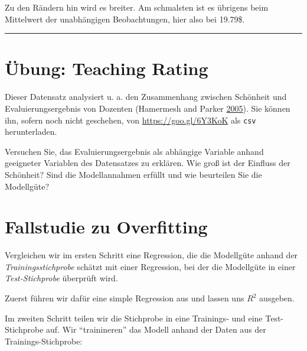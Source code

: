 \documentclass[12pt,]{book}
\newenvironment{Shaded}{\begin{snugshade}}{\end{snugshade}}
\newcommand{\KeywordTok}[1]{\textcolor[rgb]{0.13,0.29,0.53}{\textbf{{#1}}}}
\newcommand{\DataTypeTok}[1]{\textcolor[rgb]{0.13,0.29,0.53}{{#1}}}
\newcommand{\StringTok}[1]{\textcolor[rgb]{0.31,0.60,0.02}{{#1}}}
\newcommand{\CommentTok}[1]{\textcolor[rgb]{0.56,0.35,0.01}{\textit{{#1}}}}
\newcommand{\NormalTok}[1]{{#1}}
\begin{document}
Zu den Rändern hin wird es breiter. Am schmalsten ist es übrigens beim
Mittelwert der unabhängigen Beobachtungen, hier also bei 19.79\$.

\begin{center}\rule{0.5\linewidth}{\linethickness}\end{center}

\section{Übung: Teaching Rating}\label{ubung-teaching-rating}

Dieser Datensatz analysiert u. a. den Zusammenhang zwischen Schönheit
und Evaluierungsergebnis von Dozenten (Hamermesh and Parker
\protect\hyperlink{ref-hamermesh2005beauty}{2005}). Sie können ihn,
sofern noch nicht geschehen, von \url{https://goo.gl/6Y3KoK} als
\texttt{csv} herunterladen.

Versuchen Sie, das Evaluierungsergebnis als abhängige Variable anhand
geeigneter Variablen des Datensatzes zu erklären. Wie groß ist der
Einfluss der Schönheit? Sind die Modellannahmen erfüllt und wie
beurteilen Sie die Modellgüte?

\hypertarget{overfitting_casestudy}{\section{Fallstudie zu
Overfitting}\label{overfitting_casestudy}}

Vergleichen wir im ersten Schritt eine Regression, die die Modellgüte
anhand der \emph{Trainingsstichprobe} schätzt mit einer Regression, bei
der die Modellgüte in einer \emph{Test-Stichprobe} überprüft wird.

Zuerst führen wir dafür eine simple Regression aus und lassen uns
\(R^2\) ausgeben.

\begin{Shaded}
\end{Shaded}

Im zweiten Schritt teilen wir die Stichprobe in eine Trainings- und eine
Test-Stichprobe auf. Wir ``trainineren'' das Modell anhand der Daten aus
der Trainings-Stichprobe:
\end{document}
